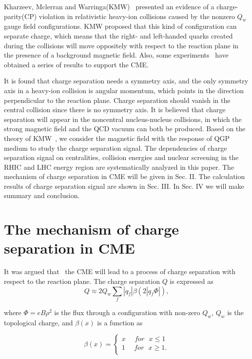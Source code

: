\documentclass[twocolumn,showpacs,preprintnumbers,amsmath,amssymb]{revtex4}
\begin{document}
Kharzeev, Mclerran and Warringa(KMW)~\cite{lab7} presented an evidence of a charge-parity(CP) violation
in relativistic heavy-ion collisions caused by the nonzero $Q_{w}$ gauge field configurations. KMW proposed that this kind of configuration can separate charge, which means
that the right- and left-handed quarks created during the collisions will move oppositely with
respect to the reaction plane in the presence of a background magnetic field.
Also, some experiments~\cite{lab8, lab9,lab10,lab11} have obtained a series of results to support the CME.

It is found that charge separation needs a symmetry axis, and the only symmetry axis in a
heavy-ion collision is angular momentum, which points in the direction perpendicular to the reaction plane. 
Charge separation should vanish in the central collision since there is no symmetry axis. 
It is believed that charge separation will appear in the noncentral nucleus-nucleus collisions, in which the strong magnetic field and the QCD vacuum can both  be produced. 
Based on the theory of KMW~\cite{lab7}, we consider the magnetic field with the response of QGP medium to study the charge separation signal. 
The dependencies of charge separation signal on centralities, collision energies and nuclear screening in the RHIC and LHC energy region are systematically analyzed in this paper.
The mechanism of charge separation in CME will be given in Sec. II. The calculation results of charge separation signal are shown in Sec. III.
In Sec. IV we will make summary and conclusion.

\section{The mechanism of charge separation in CME}
It was argued that~\cite{lab7} the CME will lead to a process of charge separation with respect to the reaction
plane. The charge separation $Q$ is expressed as
\begin{equation}%
Q\approx2Q_{w}\sum_{f}|q_{f}|\beta(2|q_{f}\Phi|),
\label{eq:eq1} %
\end{equation}

\noindent where $\Phi=eB\rho^{2}$ is the flux through a configuration with non-zero $Q_{w}$, $Q_{w}$ is the topological charge,
and $\beta(x)$ is a function as

\begin{equation}  %
\beta(x)=
\left\{
\begin{aligned}
x~~~~~~for~~~ x\leq1\\
1~~~~~~for~~~ x\geq1.\\
\end{aligned}
\right.
\label{eq:eq2} %
\end{equation}
\end{document}
